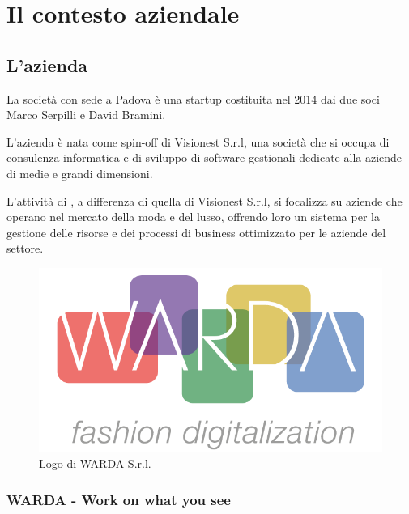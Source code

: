 
\chapter{Il contesto aziendale}
\label{cap:contesto-aziendale}

\section{L'azienda}

La società \myCompany con sede a Padova è una startup costituita nel 2014 dai due soci Marco Serpilli e David Bramini.

L'azienda è nata come spin-off di Visionest S.r.l, una società che si occupa di consulenza informatica e di sviluppo di software gestionali dedicate alla aziende di medie e grandi dimensioni.

L'attività di \myCompany, a differenza di quella di Visionest S.r.l, si focalizza su aziende che operano nel mercato della moda e del lusso, offrendo loro un sistema per la gestione delle risorse e dei processi di business ottimizzato per le aziende del settore.

\begin{figure}[htp]
\centering
\includegraphics[width=\textwidth/2]{../immagini/warda-logo}
\caption{Logo di WARDA S.r.l.}
\end{figure}

\subsection{WARDA - Work on what you see}

